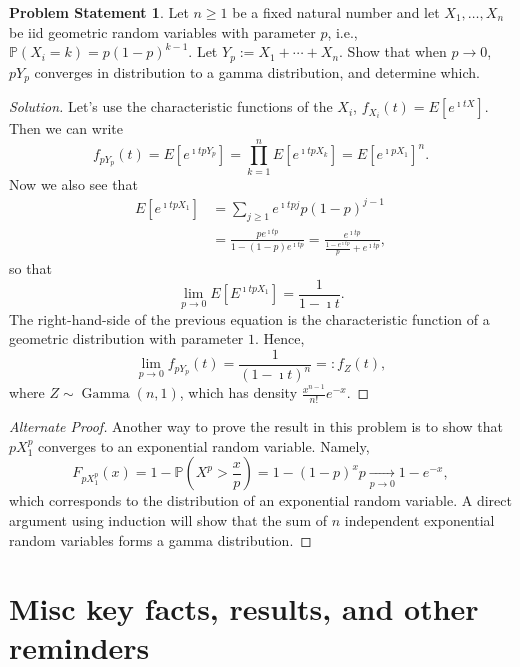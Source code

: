 \documentclass[12pt,reqno]{article}
\theoremstyle{plain}
\theoremstyle{definition}
\newtheorem{problem}[theorem]{Problem Statement}
\newcommand{\PP}[1]{\ensuremath{\mathbb{P}\left(#1\right)}}
\begin{document}
\begin{problem}
Let $n \geq 1$ be a fixed natural number and let $X_1,\ldots,X_n$ be 
iid geometric random variables with parameter $p$, i.e., 
$\PP{X_i = k} = p(1-p)^{k-1}$. Let $Y_p := X_1+\cdots+X_n$. Show that 
when $p \rightarrow 0$, $pY_p$ converges in distribution to a 
gamma distribution, and determine which. 
\end{problem}
\begin{proof}[Solution] 
Let's use the characteristic functions of the $X_i$, 
$f_{X_i}(t) = E[e^{\imath tX}]$. Then we can write 
\[
f_{pY_p}(t) = E[e^{\imath t pY_p}] = \prod_{k=1}^n E[e^{\imath tpX_k}] = 
     E[e^{\imath pX_1}]^n. 
\]
Now we also see that 
\begin{align*} 
E[e^{\imath tpX_1}] & = \sum_{j \geq 1} e^{\imath tpj} p (1-p)^{j-1} \\ 
     & = \frac{p e^{\imath tp}}{1-(1-p)e^{\imath tp}} = 
     \frac{e^{\imath tp}}{\frac{1-e^{\imath tp}}{p} + e^{\imath tp}}, 
\end{align*} 
so that 
\[
\lim_{p \rightarrow 0} E[E^{\imath tpX_1}] = \frac{1}{1-\imath t}. 
\]
The right-hand-side of the previous equation is the characteristic 
function of a geometric distribution with parameter $1$. Hence, 
\[
\lim_{p \rightarrow 0} f_{pY_p}(t) = \frac{1}{(1-\imath t)^n} =: f_Z(t), 
\]
where $Z \sim \operatorname{Gamma}(n, 1)$, which has density 
$\frac{x^{n-1}}{n!} e^{-x}$. 
\end{proof} 

\begin{proof}[Alternate Proof] 
Another way to prove the result in this problem is to show that 
$pX_1^p$ converges to an exponential random variable. Namely, 
\[
F_{pX_1^p}(x) = 1 - \PP{X^p > \frac{x}{p}} = 1 - (1-p)^{x}{p} 
     \xrightarrow[p \rightarrow 0]{} 1-e^{-x}, 
\] 
which corresponds to the distribution of an exponential random variable. 
A direct argument using induction will show that the sum of $n$ independent 
exponential random variables forms a gamma distribution. 
\end{proof} 

\newpage 
\section{Misc key facts, results, and other reminders}
\end{document}
